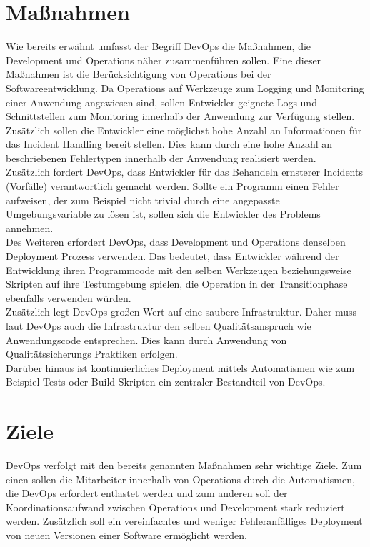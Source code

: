 \section{Maßnahmen}
Wie bereits erwähnt umfasst der Begriff DevOps die Maßnahmen, die Development und Operations näher zusammenführen sollen. Eine dieser Maßnahmen ist die Berücksichtigung von Operations bei der Softwareentwicklung. Da Operations auf Werkzeuge zum Logging und Monitoring einer Anwendung angewiesen sind, sollen Entwickler geignete Logs und Schnittstellen zum Monitoring innerhalb der Anwendung zur Verfügung stellen. Zusätzlich sollen die Entwickler eine möglichst hohe Anzahl an Informationen für das Incident Handling bereit stellen. Dies kann durch eine hohe Anzahl an beschriebenen Fehlertypen innerhalb der Anwendung realisiert werden. \\
Zusätzlich fordert DevOps, dass Entwickler für das Behandeln ernsterer Incidents (Vorfälle) verantwortlich gemacht werden. Sollte ein Programm einen Fehler aufweisen, der zum Beispiel nicht trivial durch eine angepasste Umgebungsvariable zu lösen ist, sollen sich die Entwickler des Problems annehmen. \\
Des Weiteren erfordert DevOps, dass Development und Operations denselben Deployment Prozess verwenden. Das bedeutet, dass Entwickler während der Entwicklung ihren Programmcode mit den selben Werkzeugen beziehungsweise Skripten auf ihre Testumgebung spielen, die Operation in der Transitionphase ebenfalls verwenden würden.\\
Zusätzlich legt DevOps großen Wert auf eine saubere Infrastruktur. Daher muss laut DevOps auch die Infrastruktur den selben Qualitätsanspruch wie Anwendungscode entsprechen. Dies kann durch Anwendung von Qualitätssicherungs Praktiken erfolgen. \\
Darüber hinaus ist kontinuierliches Deployment mittels Automatismen wie zum Beispiel Tests oder Build Skripten ein zentraler Bestandteil von DevOps.

\section{Ziele}
DevOps verfolgt mit den bereits genannten Maßnahmen sehr wichtige Ziele. Zum einen sollen die Mitarbeiter innerhalb von Operations durch die Automatismen, die DevOps erfordert entlastet werden und zum anderen soll der Koordinationsaufwand zwischen Operations und Development stark reduziert werden. Zusätzlich soll ein vereinfachtes und weniger Fehleranfälliges Deployment von neuen Versionen einer Software ermöglicht werden.